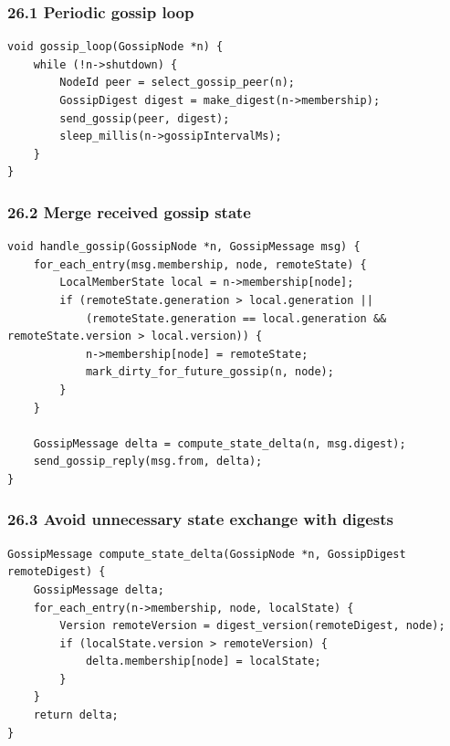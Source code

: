 \documentclass[10pt,letterpaper]{article}
\begin{document}
\subsubsection*{26.1 Periodic gossip loop}

\begin{verbatim}
void gossip_loop(GossipNode *n) {
    while (!n->shutdown) {
        NodeId peer = select_gossip_peer(n);
        GossipDigest digest = make_digest(n->membership);
        send_gossip(peer, digest);
        sleep_millis(n->gossipIntervalMs);
    }
}
\end{verbatim}

\subsubsection*{26.2 Merge received gossip state}

\begin{verbatim}
void handle_gossip(GossipNode *n, GossipMessage msg) {
    for_each_entry(msg.membership, node, remoteState) {
        LocalMemberState local = n->membership[node];
        if (remoteState.generation > local.generation ||
            (remoteState.generation == local.generation && remoteState.version > local.version)) {
            n->membership[node] = remoteState;
            mark_dirty_for_future_gossip(n, node);
        }
    }

    GossipMessage delta = compute_state_delta(n, msg.digest);
    send_gossip_reply(msg.from, delta);
}
\end{verbatim}

\subsubsection*{26.3 Avoid unnecessary state exchange with digests}

\begin{verbatim}
GossipMessage compute_state_delta(GossipNode *n, GossipDigest remoteDigest) {
    GossipMessage delta;
    for_each_entry(n->membership, node, localState) {
        Version remoteVersion = digest_version(remoteDigest, node);
        if (localState.version > remoteVersion) {
            delta.membership[node] = localState;
        }
    }
    return delta;
}
\end{verbatim}
\end{document}
